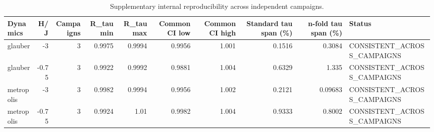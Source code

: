 \begin{table}
\caption{Supplementary internal reproducibility across independent campaigns.}
\label{tab:campaign_reproducibility}
\begin{tabular}{lrrrrrrrrl}
\toprule
Dynamics & H/J & Campaigns & R\_tau min & R\_tau max & Common CI low & Common CI high & Standard tau span (\%) & n-fold tau span (\%) & Status \\
\midrule
glauber & -3 & 3 & 0.9975 & 0.9994 & 0.9956 & 1.001 & 0.1516 & 0.3084 & CONSISTENT\_ACROSS\_CAMPAIGNS \\
glauber & -0.75 & 3 & 0.9922 & 0.9992 & 0.9881 & 1.004 & 0.6329 & 1.335 & CONSISTENT\_ACROSS\_CAMPAIGNS \\
metropolis & -3 & 3 & 0.9982 & 0.9994 & 0.9956 & 1.002 & 0.2121 & 0.09683 & CONSISTENT\_ACROSS\_CAMPAIGNS \\
metropolis & -0.75 & 3 & 0.9924 & 1.01 & 0.9982 & 1.004 & 0.9333 & 0.8002 & CONSISTENT\_ACROSS\_CAMPAIGNS \\
\bottomrule
\end{tabular}
\end{table}
